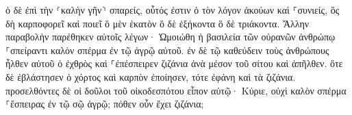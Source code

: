 \documentclass{openreader}
\begin{document}
ὁ δὲ ἐπὶ τὴν ⸂καλὴν γῆν⸃ σπαρείς, οὗτός ἐστιν ὁ τὸν λόγον ἀκούων καὶ ⸀συνιείς, ὃς δὴ καρποφορεῖ καὶ ποιεῖ ὃ μὲν ἑκατὸν ὃ δὲ ἑξήκοντα ὃ δὲ τριάκοντα. 
Ἄλλην παραβολὴν παρέθηκεν αὐτοῖς λέγων· Ὡμοιώθη ἡ βασιλεία τῶν οὐρανῶν ἀνθρώπῳ ⸀σπείραντι καλὸν σπέρμα ἐν τῷ ἀγρῷ αὐτοῦ. 
ἐν δὲ τῷ καθεύδειν τοὺς ἀνθρώπους ἦλθεν αὐτοῦ ὁ ἐχθρὸς καὶ ⸀ἐπέσπειρεν ζιζάνια ἀνὰ μέσον τοῦ σίτου καὶ ἀπῆλθεν. 
ὅτε δὲ ἐβλάστησεν ὁ χόρτος καὶ καρπὸν ἐποίησεν, τότε ἐφάνη καὶ τὰ ζιζάνια. 
προσελθόντες δὲ οἱ δοῦλοι τοῦ οἰκοδεσπότου εἶπον αὐτῷ· Κύριε, οὐχὶ καλὸν σπέρμα ⸀ἔσπειρας ἐν τῷ σῷ ἀγρῷ; πόθεν οὖν ἔχει ζιζάνια; 
\end{document}
